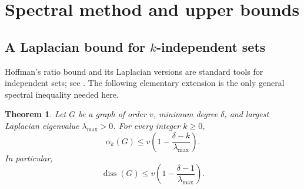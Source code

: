 \documentclass[11pt]{article}
\newtheorem{theorem}{Theorem}[section]
\theoremstyle{definition}
\DeclareMathOperator{\diss}{diss}
\begin{document}
\section{Spectral method and upper bounds}\label{sec:spectral}

\subsection{A Laplacian bound for \texorpdfstring{$k$}{k}-independent sets}
\label{sec:laplacian-bound}

Hoffman's ratio bound and its Laplacian versions are standard tools for
independent sets; see \cite{van-dam-haemers,godsil-newman,haemers}.  The
following elementary extension is the only general spectral inequality
needed here.

\begin{theorem}\label{thm:k-laplacian}
Let $G$ be a graph of order $v$, minimum degree $\delta$, and largest
Laplacian eigenvalue $\lambda_{\max}>0$.  For every integer $k\ge0$,
\begin{equation}\label{eq:k-laplacian-bound}
  \alpha_k(G)\leq
  v\left(1-\frac{\delta-k}{\lambda_{\max}}\right).
\end{equation}
In particular,
\begin{equation}\label{eq:diss-laplacian-bound}
  \diss(G)\leq
  v\left(1-\frac{\delta-1}{\lambda_{\max}}\right).
\end{equation}
\end{theorem}
\end{document}
